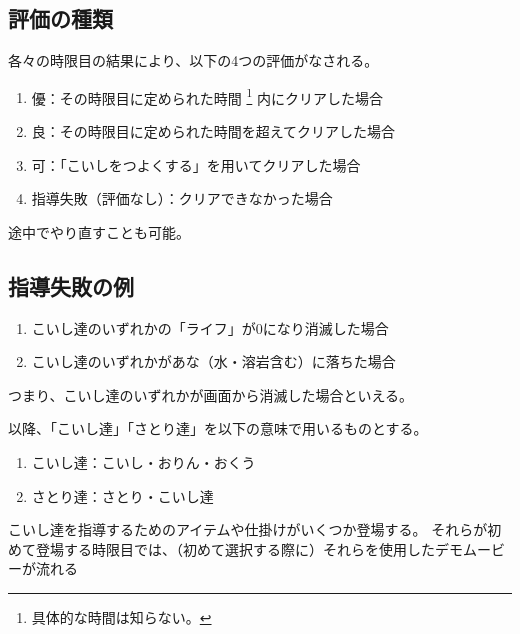 \subsection{評価の種類}
各々の時限目の結果により、以下の4つの評価がなされる。
\begin{enumerate}[label={\sarrow}]
\item 優：その時限目に定められた時間%
\footnote{具体的な時間は知らない。}%
内にクリアした場合
\item 良：その時限目に定められた時間を超えてクリアした場合
\item 可：「こいしをつよくする」を用いてクリアした場合
\item 指導失敗（評価なし）：クリアできなかった場合
\end{enumerate}
途中でやり直すことも可能。


\subsection{指導失敗の例}
\begin{enumerate}[label={\sarrow}]
\item こいし達のいずれかの「ライフ」が0になり消滅した場合
\item こいし達のいずれかがあな（水・溶岩含む）に落ちた場合
\end{enumerate}
つまり、こいし達のいずれかが画面から消滅した場合といえる。
\begin{marker}
以降、「こいし達」「さとり達」を以下の意味で用いるものとする。
\begin{enumerate}[label={\sarrow}]
\item こいし達：こいし・おりん・おくう
\item さとり達：さとり・こいし達
\end{enumerate}
\end{marker}


\clearpage
こいし達を指導するためのアイテムや仕掛けがいくつか登場する。
それらが初めて登場する時限目では、（初めて選択する際に）それらを使用したデモムービーが流れる


